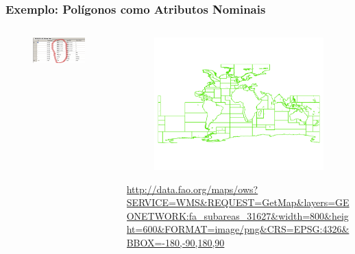 \documentclass[hyperref={pdfpagelabels=true}]{beamer}
\begin{document}
\begin{frame}
\frametitle{Exemplo: Pol\'{i}gonos como Atributos Nominais}


\begin{columns}
  \begin{column}{0.5\textwidth}
    \begin{figure}
    \includegraphics[scale=0.22]{fishing_zones1.png}
    \end{figure}
  \end{column}
  \begin{column}{0.5\textwidth}
    \begin{figure}
    \includegraphics[scale=0.22]{fishing_zones2.png}
    \end{figure}
\tiny{
\url{http://data.fao.org/maps/ows?SERVICE=WMS&REQUEST=GetMap&layers=GEONETWORK:fa_subareas_31627&width=800&height=600&FORMAT=image/png&CRS=EPSG:4326&BBOX=-180,-90,180,90}
}
  \end{column}  
\end{columns}

\end{frame}
\end{document}
